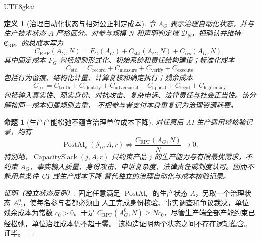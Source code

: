 \documentclass[12pt,a4paper,openany]{report}
\newtheorem{definition}{定义}[chapter]
\newtheorem{proposition}{命题}[chapter]
\newcommand{\Goods}{\mathcal J}
\DeclareMathOperator{\CapacitySlack}{CapacitySlack}
\DeclareMathOperator{\PostAI}{PostAI}
\begin{document}
\begin{CJK*}{UTF8}{gkai}
\begin{definition}[治理自动化状态与相对公正判定成本]
令 \(A_G\) 表示治理自动化状态，并与生产技术状态 \(A\) 严格区分。对参与规模 \(N\) 和声明判定域
\(\mathcal D_N\)，把确认并维持 \(\mathfrak C_{\mathrm{RPF}}\) 的总成本写为
\[
  C_{\mathrm{RPF}}(A_G,N)
  =F_G(A_G)
  +C_{\mathrm{std}}(A_G,N)
  +C_{\mathrm{res}}(A_G,N),
\]
其中固定成本 \(F_G\) 包括规则形式化、初始系统和责任结构建设；标准化成本
\[
  C_{\mathrm{std}}
  =C_{\mathrm{record}}+C_{\mathrm{measure}}
  +C_{\mathrm{verify}}+C_{\mathrm{execute}}
\]
包括行为留痕、结构化计量、计算复核和确定执行；残余成本
\[
  C_{\mathrm{res}}
  =C_{\mathrm{truth}}+C_{\mathrm{identity}}
  +C_{\mathrm{adversarial}}+C_{\mathrm{appeal}}
  +C_{\mathrm{legal}}+C_{\mathrm{legitimacy}}
\]
包括输入真实性、现实身份、对抗攻击、复杂申诉、法律责任与社会正当性。该分解按同一成本归属规则去重，
不把参与者支付本身重复记为治理资源耗费。
\end{definition}

\begin{proposition}[生产产能松弛不蕴含治理单位成本下降]
\label{prop:capacity-not-governance-cost}
对任意后 AI 生产适用域核验记录，均有
\[
  \PostAI_\epsilon(\Goods_0,A,r)
  \not\Longrightarrow
  \frac{C_{\mathrm{RPF}}(A_G,N)}{N}\to0.
\]
特别地，\(\CapacitySlack(j,A,r)\) 只约束产品 \(j\) 的生产能力与有限最优需求，不约束
\(A_G\)、事实输入质量、身份攻击、申诉复杂度、法律责任或制度认可。因而不能用总条件 C1 或生产成本下降
替代独立的治理自动化与成本核验记录。
\end{proposition}

\begin{proof}[证明（独立状态反例）]
固定任意满足 \(\PostAI_\epsilon\) 的生产状态 \(A\)，另取一个治理状态 \(A_G^0\)，使每名参与者都必须由
人工完成身份核验、事实调查和争议裁决，单位残余成本为常数 \(c_0>0\)。于是
\(C_{\mathrm{RPF}}(A_G^0,N)\ge Nc_0\)，尽管生产端全部产能约束已经松弛，单位治理成本仍不趋于零。
该构造证明两个状态之间不存在逻辑蕴含。证毕。
\end{proof}


\end{CJK*}
\end{document}
